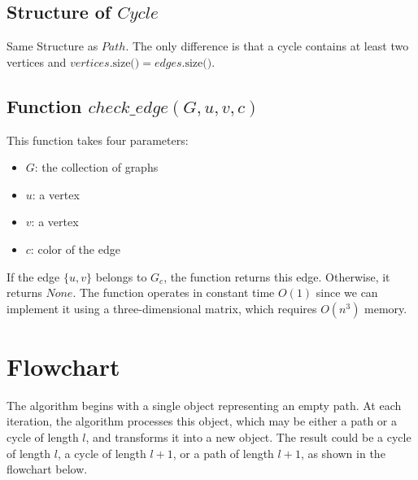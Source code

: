 \subsection{Structure of $Cycle$}

Same Structure as $Path$. The only difference is that a cycle contains
at least two vertices and $vertices\text{.size()} = edges\text{.size()}$.

\subsection{Function $check\_edge(G, u, v, c)$}

This function takes four parameters:

\begin{itemize}
    \item $G$: the collection of graphs
    \item $u$: a vertex
    \item $v$: a vertex
    \item $c$: color of the edge
\end{itemize}

If the edge $\{u, v\}$ belongs to $G_c$, the function returns this edge. Otherwise, it returns $None$. The function operates in constant time $O(1)$ since we can implement it using a three-dimensional matrix, which requires $O(n^3)$ memory.

\section{Flowchart}

The algorithm begins with a single object representing an empty path. At 
each iteration, the algorithm processes this object, which may be either 
a path or a cycle of length $l$, and transforms it into a new object. 
The result could be a cycle of length $l$, a cycle of length $l+1$, or 
a path of length $l+1$, as shown in the flowchart below.

